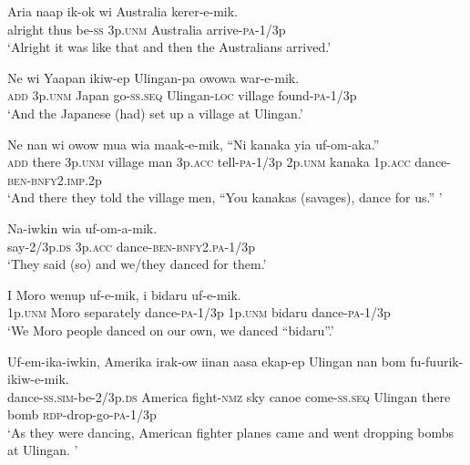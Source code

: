 \ea\label{ex:a:x55}
\gll  Aria  naap  ik-ok  wi  Australia  kerer-e-mik. \\
alright  thus  be-\textsc{ss}  3p.\textsc{unm}  Australia  arrive-\textsc{pa}-1/3p \\
\glt ‘Alright it was like that and then the Australians arrived.’ \\
\z


\ea\label{ex:a:x56}
\gll  Ne  wi  Yaapan  ikiw-ep  Ulingan-pa  owowa war-e-mik. \\
\textsc{add}  3p.\textsc{unm}  Japan  go-\textsc{ss.seq}  Ulingan-\textsc{loc}  village found-\textsc{pa}-1/3p \\ 
\glt ‘And the Japanese (had) set up a village at Ulingan.’ \\
\z


\ea\label{ex:a:x57}
\gll  Ne  nan  wi  owow  mua  wia  maak-e-mik, “Ni  kanaka  yia  uf-om-aka.” \\
\textsc{add}  there  3p.\textsc{unm}  village  man  3p.\textsc{acc}  tell-\textsc{pa}-1/3p  2p.\textsc{unm}  kanaka  1p.\textsc{acc}  dance-\textsc{ben}-\textsc{bnfy}2.\textsc{imp}.2p \\ 
\glt ‘And there they told the village men, “You kanakas (savages), dance for us.” ’ \\
\z


\ea\label{ex:a:x58}
\gll  Na-iwkin  wia  uf-om-a-mik. \\
say-2/3p.\textsc{ds}  3p.\textsc{acc}  dance-\textsc{ben}-\textsc{bnfy}2.\textsc{pa}-1/3p \\
\glt ‘They said (so) and we/they danced for them.’ \\
\z


\ea\label{ex:a:x59}
\gll  I  Moro  wenup  uf-e-mik, i  bidaru  uf-e-mik. \\
1p.\textsc{unm}  Moro  separately  dance-\textsc{pa}-1/3p 1p.\textsc{unm}  bidaru  dance-\textsc{pa}-1/3p \\ 
\glt ‘We Moro people danced on our own, we danced “bidaru”.’ \\
\z


\ea\label{ex:a:x60}
\gll  Uf-em-ika-iwkin,  Amerika  irak-ow  iinan  aasa  ekap-ep  Ulingan  nan  bom  fu-fuurik-ikiw-e-mik. \\
dance-\textsc{ss}.\textsc{sim}-be-2/3p.\textsc{ds}  America  fight-\textsc{nmz}  sky  canoe come-\textsc{ss.seq}  Ulingan  there  bomb  \textsc{rdp}-drop-go-\textsc{pa}-1/3p \\ 
\glt ‘As they were dancing, American fighter planes came and went dropping bombs at Ulingan. ’ \\
\z


